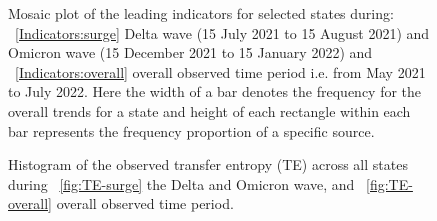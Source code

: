 \documentclass[conference,compsoc]{IEEEtran}
\begin{document}
\begin{figure}[!t]
    \centering
     \hfil
     \caption{Mosaic plot of the leading indicators for selected states during: ~\ref{Indicators:surge} Delta wave (15 July 2021 to 15 August 2021) and  Omicron wave (15 December 2021 to 15 January 2022) and ~\ref{Indicators:overall} overall observed time period i.e. from May 2021 to July 2022. Here the width of a bar denotes the frequency for the overall trends for a state and height of each rectangle within each bar represents the frequency proportion of a specific source.}
 \end{figure}
 
\begin{figure}[!t]
    \centering
     \hfil
     \caption{Histogram of the observed transfer entropy (TE) across all states during ~\ref{fig:TE-surge} the Delta and Omicron wave, and ~\ref{fig:TE-overall} overall observed time period.  }
 \end{figure}
\end{document}
